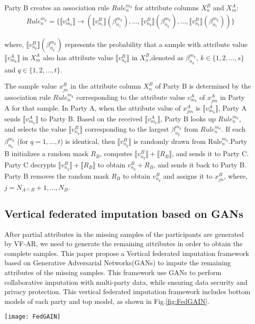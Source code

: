 \documentclass[final,1p,times]{elsarticle}
\begin{document}
Party B creates an association rule ${Rule_n^{m_k}}$ for attribute columns $X_n^B$ and $X_m^A$:
\begin{equation}
	\begin{aligned}
		&Rule_n^{m_k}=\{\llbracket v_{m_k}^A \rrbracket \to (\llbracket v_{n_1}^B \rrbracket (\beta_{n_1}^{m_k}),..., \llbracket v_{n_q}^B \rrbracket (\beta_{n_q}^{m_k}),...,\llbracket v_{n_t}^B \rrbracket (\beta_{n_t}^{m_k}))\}
	\end{aligned}
\end{equation}

where, $\llbracket v_{n_q}^B \rrbracket (\beta_{n_q}^{m_k})$ represents the probability that a sample with attribute value $\llbracket v_{m_k}^A \rrbracket$ in $X_m^A$ also has attribute value $\llbracket v_{n_q}^B \rrbracket$ in $X_n^B$,denoted as ${\beta_{n_{q}}^{m_{k}}}$,  ${k}\in\{1,2,...,s\}$ and ${q}\in\{1,2,\ldots,{t}\}.$

The sample value $x_{jn}^B$ in the attribute column $X_n^B$ of Party B is determined by the association rule ${Rule_n^{m_k}}$ corresponding to the attribute value $v_{m_k}^A$ of $x_{jm}^A$ in Party A for that sample. In Party A, when the attribute value of $x_{jm}^A$ is $\llbracket v_{m_k}^A \rrbracket$, Party A sends \( \llbracket v_{m_k}^A \rrbracket \) to Party B. Based on the received \( \llbracket v_{m_k}^A \rrbracket \), Party B looks up ${Rule_n^{m_k}}$, and selects the value $\llbracket v_{n_q}^B \rrbracket$ corresponding to the largest ${\beta_{n_q}^{m_k}}$ from ${Rule_n^{m_k}}$. If each \( \beta_{n_q}^{m_k} \) (for \( q=1,\dots,t \)) is identical, then \( \llbracket v_{n_q}^B \rrbracket \) is randomly drawn from \( \text{Rule}_n^{m_k} \).Party B initializes a random mask $R_B$, computes ${\llbracket v_{n_q}^B \rrbracket}+ \llbracket {R_B} \rrbracket$, and sends it to Party C. Party C decrypts ${\llbracket v_{n_q}^B \rrbracket}+ \llbracket {R_B} \rrbracket$ to obtain ${v_{n_{q}}^B+R_B}$, and sends it back to Party B. Party B removes the random mask $R_B$ to obtain ${v_{n_q}^B}$ and assigns it to $x_{jn}^B$, where, ${j=N_{{A}\cap {B}}+1,\ldots,N_{B}}$.

\subsection{Vertical federated imputation based on GANs}
\label{subsec33}

After partial attributes in the missing samples of the participants are generated by VF-AR, we need to generate the remaining attributes in order to obtain the complete samples. This paper propose a Vertical federated imputation framework based on Generative Adversarial Networks(GANs) to impute the remaining attributes of the missing samples. This framework use GANs to perform collaborative imputation with multi-party data, while ensuring data security and privacy protection. This vertical federated imputation framework includes bottom models of each party and top model, as shown in Fig.\ref{fig:FedGAIN}. 
\begin{figure*}[t]
	\centering 
	\texttt{[image: FedGAIN]}%
	\caption{The framework of vertical federated imputation based on GANs} 
	\label{fig:FedGAIN}
\end{figure*}
\end{document}
